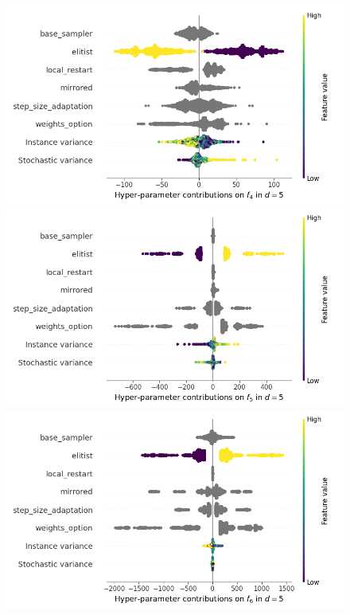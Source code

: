\begin{figure}[t]
	\includegraphics[height=0.15\textheight,trim=60mm 0mm 0mm 0mm,clip]{images/img_summary_f4_d5.png}
	\includegraphics[height=0.15\textheight,trim=0mm 0mm 30mm 0mm,clip]{images/img_summary_f5_d5.png}
	\includegraphics[height=0.15\textheight,trim=60mm 0mm 30mm 0mm,clip]{images/img_summary_f6_d5.png}

\end{figure}
